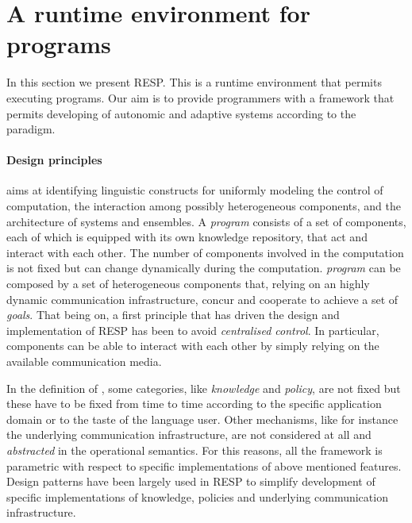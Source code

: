 \documentclass[11pt]{article}
\newtheorem{remark}{Remark}[section]
\newcommand{\resp}{\textsf{RESP}}
\begin{document}

\section{A runtime environment for \SCEL{} programs}
\label{sec:resp}

In this section we present \resp{}. This is a runtime environment that permits executing \SCEL{} programs. 
Our aim is to provide programmers with a framework that permits developing of autonomic and adaptive
systems according to the \SCEL{} paradigm. 

\paragraph{Design principles}

\SCEL{} aims at identifying linguistic constructs for uniformly modeling the control of computation, the interaction among possibly 
heterogeneous components, and the architecture of systems and ensembles.
%
A \SCEL{} \emph{program} consists of a set of components, each of which is equipped with its own knowledge repository, that
act and interact with each other. The number of components involved in the computation is not fixed but can change dynamically
during the computation. 
%
 \SCEL{} \emph{program} can be composed by a set of heterogeneous components that, relying on an highly dynamic communication
infrastructure,  concur  and cooperate to achieve a set of \emph{goals}.
%
That being on, a first principle that has driven the design and implementation of \resp{} has been to avoid \emph{centralised control}.
%
In particular, components can be able to interact with each other by simply relying on the available communication media.

In the definition of \SCEL{}, some categories, like \emph{knowledge} and \emph{policy}, are not fixed but these have to be fixed 
from time to time according to the specific application domain or to the taste of the language user. Other mechanisms, like for instance 
the underlying communication infrastructure, are not considered at all and \emph{abstracted} in the operational semantics. 
%
For this reasons, all the framework is parametric with respect to specific implementations of above mentioned features. Design patterns 
have been largely used in \resp{} to simplify development of specific implementations of knowledge, policies and underlying communication
infrastructure.
\end{document}
